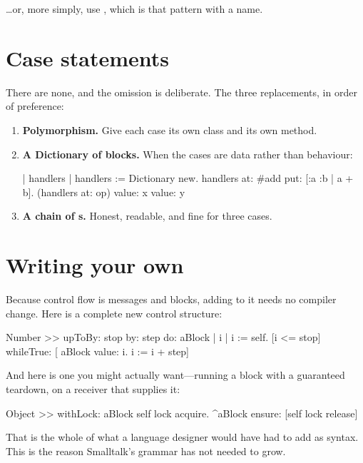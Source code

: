 \ldots or, more simply, use , which is that pattern with a
name.

\section{Case statements}

There are none, and the omission is deliberate. The three replacements, in
order of preference:

\begin{enumerate}
\item \textbf{Polymorphism.} Give each case its own class and its own method.
\item \textbf{A Dictionary of blocks.} When the cases are data rather than
  behaviour:
\begin{st}
| handlers |
handlers := Dictionary new.
handlers at: #add put: [:a :b | a + b].
(handlers at: op) value: x value: y
\end{st}
\item \textbf{A chain of s.} Honest, readable, and fine for three
  cases.
\end{enumerate}

\section{Writing your own}

Because control flow is messages and blocks, adding to it needs no compiler
change. Here is a complete new control structure:

\begin{st}
Number >> upToBy: stop by: step do: aBlock
    | i |
    i := self.
    [i <= stop] whileTrue: [
        aBlock value: i.
        i := i + step]
\end{st}

And here is one you might actually want---running a block with a guaranteed
teardown, on a receiver that supplies it:

\begin{st}
Object >> withLock: aBlock
    self lock acquire.
    ^aBlock ensure: [self lock release]
\end{st}

That is the whole of what a language designer would have had to add as
syntax. This is the reason Smalltalk's grammar has not needed to grow.
